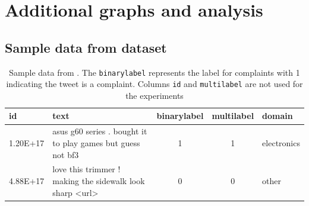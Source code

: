 \chapter{Additional graphs and analysis}

\section{Sample data from dataset}
\begin{table}[ht]
    \captionsetup{font=small}
    \centering
    \begin{tabularx}{\textwidth}{|l|X|c|c|l|}
        \hline
        \rowcolor[gray]{0.7}
        \textbf{id} & \textbf{text}                                               & \textbf{binarylabel} & \textbf{multilabel} & \textbf{domain} \\
        \hline
        1.20E+17    & asus g60 series . bought it to play games but guess not bf3 & 1                    & 1                   & electronics     \\
        \hline
        4.88E+17    & love this trimmer ! making the sidewalk look sharp <url>    & 0                    & 0                   & other           \\
        \hline
    \end{tabularx}
    \caption{Sample data from \cite{jinModelingSeverityComplaints2021}. The \texttt{binarylabel} represents the label for complaints with 1 indicating the tweet is a complaint. Columns \texttt{id} and \texttt{multilabel} are not used for the experiments}
    \label{tab: apdx_sample_data}
\end{table}

